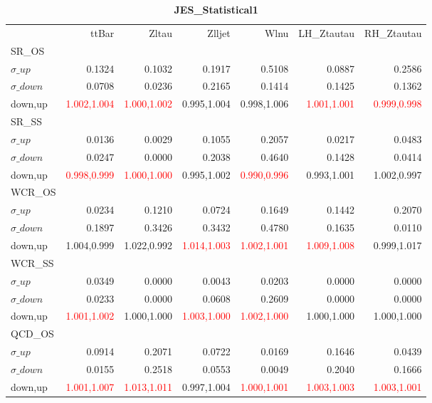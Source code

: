 \documentclass[11pt,oneside,a4paper]{article}
\begin{document}
\begin{table}
\centering
\caption{\bf{JES\_Statistical1}}
\begin{tabular}{lrrrrrr}
 & ttBar & Zltau & Zlljet & Wlnu & LH\_Ztautau & RH\_Ztautau \\
SR\_OS &  &  &  &  &  &  \\
$\sigma\_up$ & 0.1324 & 0.1032 & 0.1917 & 0.5108 & 0.0887 & 0.2586 \\
$\sigma\_down$ & 0.0708 & 0.0236 & 0.2165 & 0.1414 & 0.1425 & 0.1362 \\
down,up & \textcolor{red}{1.002,1.004} & \textcolor{red}{1.000,1.002} & 0.995,1.004 & 0.998,1.006 & \textcolor{red}{1.001,1.001} & \textcolor{red}{0.999,0.998} \\

\hline
SR\_SS &  &  &  &  &  &  \\
$\sigma\_up$ & 0.0136 & 0.0029 & 0.1055 & 0.2057 & 0.0217 & 0.0483 \\
$\sigma\_down$ & 0.0247 & 0.0000 & 0.2038 & 0.4640 & 0.1428 & 0.0414 \\
down,up & \textcolor{red}{0.998,0.999} & \textcolor{red}{1.000,1.000} & 0.995,1.002 & \textcolor{red}{0.990,0.996} & 0.993,1.001 & 1.002,0.997 \\

\hline
WCR\_OS &  &  &  &  &  &  \\
$\sigma\_up$ & 0.0234 & 0.1210 & 0.0724 & 0.1649 & 0.1442 & 0.2070 \\
$\sigma\_down$ & 0.1897 & 0.3426 & 0.3432 & 0.4780 & 0.1635 & 0.0110 \\
down,up & 1.004,0.999 & 1.022,0.992 & \textcolor{red}{1.014,1.003} & \textcolor{red}{1.002,1.001} & \textcolor{red}{1.009,1.008} & 0.999,1.017 \\

\hline
WCR\_SS &  &  &  &  &  &  \\
$\sigma\_up$ & 0.0349 & 0.0000 & 0.0043 & 0.0203 & 0.0000 & 0.0000 \\
$\sigma\_down$ & 0.0233 & 0.0000 & 0.0608 & 0.2609 & 0.0000 & 0.0000 \\
down,up & \textcolor{red}{1.001,1.002} & 1.000,1.000 & \textcolor{red}{1.003,1.000} & \textcolor{red}{1.002,1.000} & 1.000,1.000 & 1.000,1.000 \\

\hline
QCD\_OS &  &  &  &  &  &  \\
$\sigma\_up$ & 0.0914 & 0.2071 & 0.0722 & 0.0169 & 0.1646 & 0.0439 \\
$\sigma\_down$ & 0.0155 & 0.2518 & 0.0553 & 0.0049 & 0.2040 & 0.1666 \\
down,up & \textcolor{red}{1.001,1.007} & \textcolor{red}{1.013,1.011} & 0.997,1.004 & \textcolor{red}{1.000,1.001} & \textcolor{red}{1.003,1.003} & \textcolor{red}{1.003,1.001} \\


\end{tabular}
\end{table}
\end{document}
